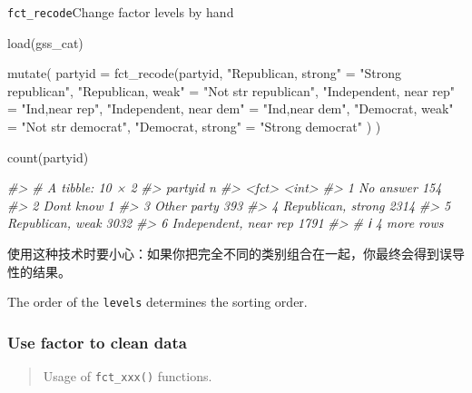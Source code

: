 \documentclass[
]{article}
\newenvironment{Shaded}{}{}
\newcommand{\AttributeTok}[1]{\textcolor[rgb]{0.49,0.56,0.16}{#1}}
\newcommand{\CommentTok}[1]{\textcolor[rgb]{0.38,0.63,0.69}{\textit{#1}}}
\newcommand{\FunctionTok}[1]{\textcolor[rgb]{0.02,0.16,0.49}{#1}}
\newcommand{\NormalTok}[1]{#1}
\newcommand{\OtherTok}[1]{\textcolor[rgb]{0.00,0.44,0.13}{#1}}
\newcommand{\StringTok}[1]{\textcolor[rgb]{0.25,0.44,0.63}{#1}}
\begin{document}
\texttt{fct\_recode}Change factor levels by hand

\begin{Shaded}
\begin{Highlighting}[]
\FunctionTok{load}\NormalTok{(gss\_cat)}

\FunctionTok{mutate}\NormalTok{(}
  \AttributeTok{partyid =} \FunctionTok{fct\_recode}\NormalTok{(partyid,}
    \StringTok{"Republican, strong"}    \OtherTok{=} \StringTok{"Strong republican"}\NormalTok{,}
    \StringTok{"Republican, weak"}      \OtherTok{=} \StringTok{"Not str republican"}\NormalTok{,}
    \StringTok{"Independent, near rep"} \OtherTok{=} \StringTok{"Ind,near rep"}\NormalTok{,}
    \StringTok{"Independent, near dem"} \OtherTok{=} \StringTok{"Ind,near dem"}\NormalTok{,}
    \StringTok{"Democrat, weak"}        \OtherTok{=} \StringTok{"Not str democrat"}\NormalTok{,}
    \StringTok{"Democrat, strong"}      \OtherTok{=} \StringTok{"Strong democrat"}
\NormalTok{  )}
\NormalTok{) }

\FunctionTok{count}\NormalTok{(partyid)}

\CommentTok{\#\textgreater{} \# A tibble: 10 × 2}
\CommentTok{\#\textgreater{}   partyid                   n}
\CommentTok{\#\textgreater{}   \textless{}fct\textgreater{}                 \textless{}int\textgreater{}}
\CommentTok{\#\textgreater{} 1 No answer               154}
\CommentTok{\#\textgreater{} 2 Don\textquotesingle{}t know                1}
\CommentTok{\#\textgreater{} 3 Other party             393}
\CommentTok{\#\textgreater{} 4 Republican, strong     2314}
\CommentTok{\#\textgreater{} 5 Republican, weak       3032}
\CommentTok{\#\textgreater{} 6 Independent, near rep  1791}
\CommentTok{\#\textgreater{} \# ℹ 4 more rows}
\end{Highlighting}
\end{Shaded}

使用这种技术时要小心：如果你把完全不同的类别组合在一起，你最终会得到误导性的结果。

The order of the \texttt{levels} determines the sorting order.

\hypertarget{use-factor-to-clean-data}{%
\subsubsection{Use factor to clean
data}\label{use-factor-to-clean-data}}

\begin{quote}
Usage of \texttt{fct\_xxx()} functions.
\end{quote}
\end{document}
